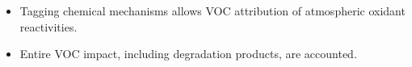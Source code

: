 \begin{BlueBox}
    \vskip-1cm
    \begin{block}{}
        \begin{itemize}
            \item Tagging chemical mechanisms allows VOC attribution of atmospheric oxidant reactivities. \vspace{9mm}
            \item Entire VOC impact, including degradation products, are accounted. \vspace{5mm} 
        \end{itemize}        
    \end{block}
\end{BlueBox}
